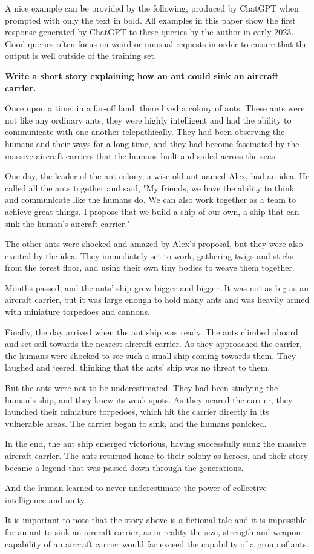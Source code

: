 \documentclass[output=paper,colorlinks,citecolor=brown
]{langscibook}
\begin{document}
A nice example can be provided by the following, produced by ChatGPT when prompted with only the text in bold. All examples in this paper show the first response generated by ChatGPT to these queries by the author in early 2023. Good queries often focus on weird or unusual requests in order to ensure that the output is well outside of the training set. 
\begin{myquote}
\textbf{Write a short story explaining how an ant could sink an aircraft carrier.}

Once upon a time, in a far-off land, there lived a colony of ants. These ants were not like any ordinary ants, they were highly intelligent and had the ability to communicate with one another telepathically. They had been observing the humans and their ways for a long time, and they had become fascinated by the massive aircraft carriers that the humans built and sailed across the seas.

One day, the leader of the ant colony, a wise old ant named Alex, had an idea. He called all the ants together and said, "My friends, we have the ability to think and communicate like the humans do. We can also work together as a team to achieve great things. I propose that we build a ship of our own, a ship that can sink the human's aircraft carrier."

The other ants were shocked and amazed by Alex's proposal, but they were also excited by the idea. They immediately set to work, gathering twigs and sticks from the forest floor, and using their own tiny bodies to weave them together.

Months passed, and the ants' ship grew bigger and bigger. It was not as big as an aircraft carrier, but it was large enough to hold many ants and was heavily armed with miniature torpedoes and cannons.

Finally, the day arrived when the ant ship was ready. The ants climbed aboard and set sail towards the nearest aircraft carrier. As they approached the carrier, the humans were shocked to see such a small ship coming towards them. They laughed and jeered, thinking that the ants' ship was no threat to them.

But the ants were not to be underestimated. They had been studying the human's ship, and they knew its weak spots. As they neared the carrier, they launched their miniature torpedoes, which hit the carrier directly in its vulnerable areas. The carrier began to sink, and the humans panicked.

In the end, the ant ship emerged victorious, having successfully sunk the massive aircraft carrier. The ants returned home to their colony as heroes, and their story became a legend that was passed down through the generations.

And the human learned to never underestimate the power of collective intelligence and unity.

It is important to note that the story above is a fictional tale and it is impossible for an ant to sink an aircraft carrier, as in reality the size, strength and weapon capability of an aircraft carrier would far exceed the capability of a group of ants.
\end{myquote}
\end{document}
